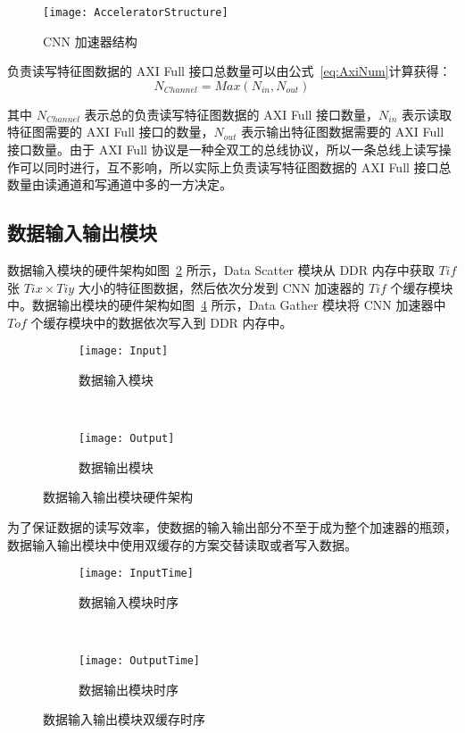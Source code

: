 \begin{figure}[!htbp]
    \centering
    \texttt{[image: AcceleratorStructure]}
    \caption{CNN 加速器结构}
    \label{fig:AcceleratorStructure}
\end{figure}

负责读写特征图数据的 AXI Full 接口总数量可以由公式~\ref{eq:AxiNum}计算获得：
\begin{equation} \label{eq:AxiNum}
N_{Channel} = Max(N_{in}, N_{out})
\end{equation}

其中 $N_{Channel}$ 表示总的负责读写特征图数据的 AXI Full 接口数量，$N_{in}$ 表示读取特征图需要的 AXI Full 接口的数量，$N_{out}$ 表示输出特征图数据需要的 AXI Full 接口数量。由于 AXI Full 协议是一种全双工的总线协议，所以一条总线上读写操作可以同时进行，互不影响，所以实际上负责读写特征图数据的 AXI Full 接口总数量由读通道和写通道中多的一方决定。

\subsection{数据输入输出模块}

数据输入模块的硬件架构如图~\ref{fig:Input} 所示，Data Scatter 模块从 DDR 内存中获取 $Tif$ 张 $Tix \times Tiy$ 大小的特征图数据，然后依次分发到 CNN 加速器的 $Tif$ 个缓存模块中。数据输出模块的硬件架构如图~\ref{fig:Output} 所示，Data Gather 模块将 CNN 加速器中 $Tof$ 个缓存模块中的数据依次写入到 DDR 内存中。

\begin{figure}[!htbp]
    \centering
    \begin{subfigure}[b]{0.6\textwidth}
        \texttt{[image: Input]}
        \caption{数据输入模块}
        \label{fig:Input}
    \end{subfigure}
    \\%
    \begin{subfigure}[b]{0.6\textwidth}
        \texttt{[image: Output]}
        \caption{数据输出模块}
        \label{fig:Output}
    \end{subfigure}
    \caption{数据输入输出模块硬件架构}
\end{figure}

为了保证数据的读写效率，使数据的输入输出部分不至于成为整个加速器的瓶颈，数据输入输出模块中使用双缓存的方案交替读取或者写入数据。

\begin{figure}[!htbp]
    \centering
    \begin{subfigure}[b]{0.6\textwidth}
        \texttt{[image: InputTime]}
        \caption{数据输入模块时序}
        \label{fig:InputTime}
    \end{subfigure}
    \\%
    \begin{subfigure}[b]{0.6\textwidth}
        \texttt{[image: OutputTime]}
        \caption{数据输出模块时序}
        \label{fig:OutputTime}
    \end{subfigure}
    \caption{数据输入输出模块双缓存时序}
\end{figure}

